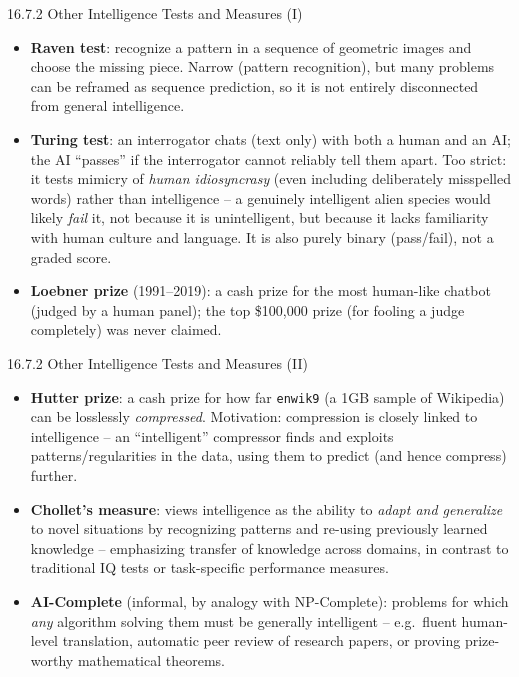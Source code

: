 \documentclass[aspectratio=169,10pt]{beamer}
\begin{document}
\begin{frame}{16.7.2 Other Intelligence Tests and Measures (I)}
  \begin{itemize}
    \item \textbf{Raven test}: recognize a pattern in a sequence of
      geometric images and choose the missing piece. Narrow (pattern
      recognition), but many problems can be reframed as sequence
      prediction, so it is not entirely disconnected from general
      intelligence.
    \item \textbf{Turing test}: an interrogator chats (text only) with both
      a human and an AI; the AI ``passes'' if the interrogator cannot
      reliably tell them apart. Too strict: it tests mimicry of \emph{human
      idiosyncrasy} (even including deliberately misspelled words) rather
      than intelligence -- a genuinely intelligent alien species would
      likely \emph{fail} it, not because it is unintelligent, but because it
      lacks familiarity with human culture and language. It is also purely
      binary (pass/fail), not a graded score.
    \item \textbf{Loebner prize} (1991--2019): a cash prize for the most
      human-like chatbot (judged by a human panel); the top \$100{,}000
      prize (for fooling a judge completely) was never claimed.
  \end{itemize}
\end{frame}

\begin{frame}{16.7.2 Other Intelligence Tests and Measures (II)}
  \begin{itemize}
    \item \textbf{Hutter prize}: a cash prize for how far
      \texttt{enwik9} (a 1GB sample of Wikipedia) can be losslessly
      \emph{compressed}. Motivation: compression is closely linked to
      intelligence -- an ``intelligent'' compressor finds and exploits
      patterns/regularities in the data, using them to predict (and hence
      compress) further.
    \item \textbf{Chollet's measure}: views intelligence as the ability to
      \emph{adapt and generalize} to novel situations by recognizing
      patterns and re-using previously learned knowledge -- emphasizing
      transfer of knowledge across domains, in contrast to traditional IQ
      tests or task-specific performance measures.
    \item \textbf{AI-Complete} (informal, by analogy with NP-Complete):
      problems for which \emph{any} algorithm solving them must be
      generally intelligent -- e.g.\ fluent human-level translation,
      automatic peer review of research papers, or proving prize-worthy
      mathematical theorems.
  \end{itemize}
\end{frame}
\end{document}
